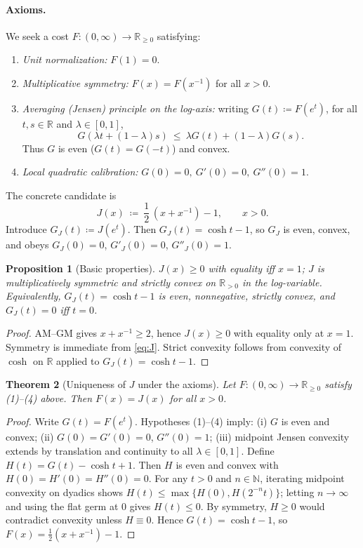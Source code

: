 \documentclass[12pt,a4paper]{article}
\newtheorem{theorem}{Theorem}[section]
\newtheorem{proposition}[theorem]{Proposition}
\theoremstyle{definition}
\theoremstyle{remark}
\begin{document}
\paragraph{Axioms.} We seek a cost $F:(0,\infty)\to \mathbb{R}_{\ge 0}$ satisfying:
\begin{enumerate}
  \item \emph{Unit normalization:} $F(1)=0$.
  \item \emph{Multiplicative symmetry:} $F(x)=F(x^{-1})$ for all $x>0$.
  \item \emph{Averaging (Jensen) principle on the log-axis:} writing $G(t)\coloneqq F(e^t)$, for all $t,s\in\mathbb{R}$ and $\lambda\in[0,1]$,
  \[
     G(\lambda t+(1-\lambda)s)\ \le\ \lambda G(t)+(1-\lambda)G(s).\tag{A}
  \]
  Thus $G$ is even ($G(t)=G(-t)$) and convex.
  \item \emph{Local quadratic calibration:} $G(0)=0,\ G'(0)=0,\ G''(0)=1$.
\end{enumerate}

The concrete candidate is
\begin{equation}\label{eq:J}
  J(x)\ \coloneqq\ \frac12\,(x+x^{-1})-1,\qquad x>0.
\end{equation}
Introduce $G_J(t)\coloneqq J(e^t)$. Then $G_J(t)=\cosh t-1$, so $G_J$ is even, convex, and obeys $G_J(0)=0$, $G'_J(0)=0$, $G''_J(0)=1$.

\begin{proposition}[Basic properties]
\label{prop:basic-J}
$J(x)\ge 0$ with equality iff $x=1$; $J$ is multiplicatively symmetric and strictly convex on $\mathbb{R}_{>0}$ in the log-variable. Equivalently, $G_J(t)=\cosh t - 1$ is even, nonnegative, strictly convex, and $G_J(t)=0$ iff $t=0$.
\end{proposition}

\begin{proof}
AM--GM gives $x+x^{-1}\ge 2$, hence $J(x)\ge 0$ with equality only at $x=1$. Symmetry is immediate from \eqref{eq:J}. Strict convexity follows from convexity of $\cosh$ on $\mathbb{R}$ applied to $G_J(t)=\cosh t-1$.
\end{proof}

\begin{theorem}[Uniqueness of $J$ under the axioms]
\label{thm:uniqueness-J}
Let $F:(0,\infty)\to\mathbb{R}_{\ge 0}$ satisfy (1)--(4) above. Then $F(x)=J(x)$ for all $x>0$.
\end{theorem}

\begin{proof}
Write $G(t)=F(e^t)$. Hypotheses (1)–(4) imply: (i) $G$ is even and convex; (ii) $G(0)=G'(0)=0$, $G''(0)=1$; (iii) midpoint Jensen convexity extends by translation and continuity to all $\lambda\in[0,1]$. Define $H(t)=G(t)-\cosh t+1$. Then $H$ is even and convex with $H(0)=H'(0)=H''(0)=0$. For any $t>0$ and $n\in\mathbb{N}$, iterating midpoint convexity on dyadics shows $H(t)\le \max\{H(0),H(2^{-n}t)\}$; letting $n\to\infty$ and using the flat germ at $0$ gives $H(t)\le 0$. By symmetry, $H\ge 0$ would contradict convexity unless $H\equiv 0$. Hence $G(t)=\cosh t-1$, so $F(x)=\tfrac12(x+x^{-1})-1$.
\end{proof}
\end{document}
